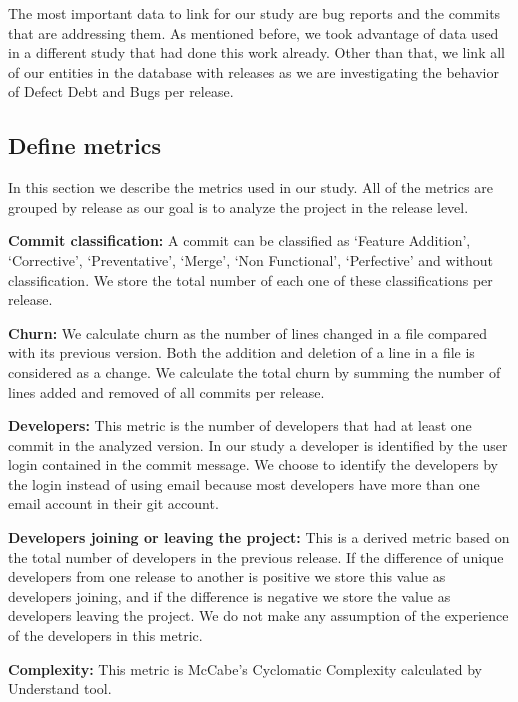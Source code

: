 The most important data to link for our study are bug reports and the commits that are addressing them. As mentioned before, we took advantage of data used in a different study that had done this work already. Other than that, we link all of our entities in the database with releases as we are investigating the behavior of Defect Debt and Bugs per release. 

\subsection{Define metrics}

In this section we describe the metrics used in our study. All of the metrics are grouped by release as our goal is to analyze the project in the release level. 

\textbf{Commit classification:} A commit can be classified as `Feature Addition', `Corrective', `Preventative', `Merge', `Non Functional', `Perfective' and without classification. We store the total number of each one of these classifications per release. %

\textbf{Churn:} We calculate churn as the number of lines changed in a file compared with its previous version. Both the addition and deletion of a line in a file is considered as a change. We calculate the total churn by summing the number of lines added and removed of all commits per release. %

\textbf{Developers:} This metric is the number of developers that had at least one commit in the analyzed version. In our study a developer is identified by the user login contained in the commit message. We choose to identify the developers by the login instead of using email because most developers have more than one email account in their git account. 

\textbf{Developers joining or leaving the project:} This is a derived metric based on the total number of developers in the previous release. If the difference of unique developers from one release to another is positive we store this value as developers joining, and if the difference is negative we store the value as developers leaving the project. We do not make any assumption of the experience of the developers in this metric.

\textbf{Complexity:} This metric is McCabe's Cyclomatic Complexity \cite{mccabeTSE1976} calculated by Understand tool.

